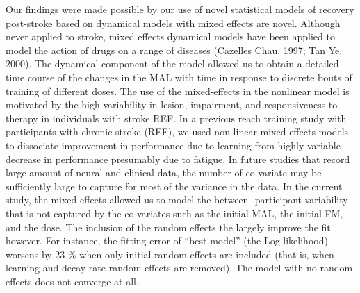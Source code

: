 Our findings were made possible by our use of novel statistical models of recovery post-stroke based on dynamical models with mixed effects are novel.
Although never applied to stroke, mixed effects dynamical models have been applied to model the action of drugs on a range of diseases (Cazelles Chau, 1997; Tan  Ye, 2000).  
The dynamical component of the model allowed us to obtain a detailed time course of the changes in the MAL with time in response to discrete bouts of training of different doses. 
The use of the mixed-effects in the nonlinear model is motivated by the high variability in lesion, impairment, and responsiveness to therapy in individuals with stroke REF. 
In a previous reach training study with participants with chronic stroke (REF), we used non-linear mixed effects models to dissociate improvement in performance due to learning from highly variable decrease in performance presumably due to fatigue. 
In future studies that record large amount of neural and clinical data, the number of co-variate may be sufficiently large to capture for most of the variance in the data. 
In the current study, the mixed-effects allowed us to model the between- participant variability that is not captured by the co-variates such as the initial MAL, the initial FM, and the dose. 
The inclusion of the random effects the largely improve the fit however. 
For instance, the fitting error of  “best model” (the Log-likelihood) worsens by 23 \% when only initial random effects are included (that is, when learning and decay rate random effects are removed). 
The model with no random effects does not converge at all. 


